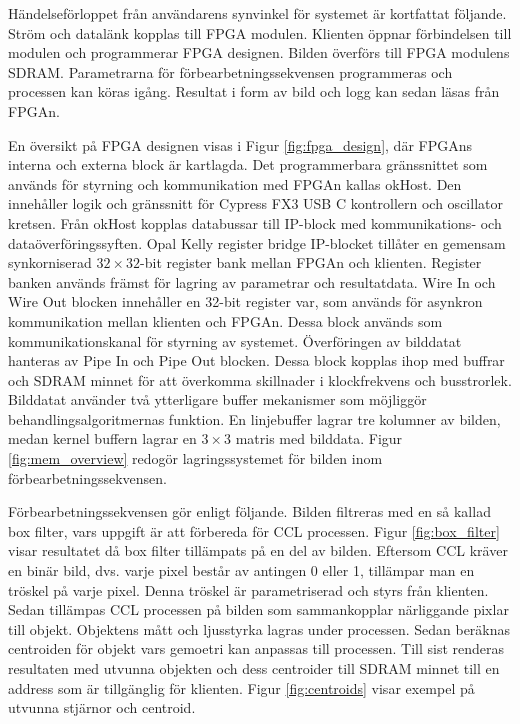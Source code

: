 \documentclass[12pt]{report}
\begin{document}
\par
Händelseförloppet från användarens synvinkel för systemet är kortfattat följande. Ström och datalänk kopplas till FPGA modulen. Klienten öppnar förbindelsen till modulen och programmerar FPGA designen. Bilden överförs till FPGA modulens SDRAM. Parametrarna för förbearbetningssekvensen programmeras och processen kan köras igång. Resultat i form av bild och logg kan sedan läsas från FPGAn.
\par
En översikt på FPGA designen visas i Figur \ref{fig:fpga_design}, där FPGAns interna och externa block är kartlagda. Det programmerbara gränssnittet som används för styrning och kommunikation med FPGAn kallas okHost. Den innehåller logik och gränssnitt för Cypress FX3 USB C kontrollern och oscillator kretsen. Från okHost kopplas databussar till IP-block med kommunikations- och dataöverföringssyften. Opal Kelly register bridge IP-blocket tillåter en gemensam synkorniserad $32 \times 32$-bit register bank mellan FPGAn och klienten. Register banken används främst för lagring av parametrar och resultatdata. Wire In och Wire Out blocken innehåller en 32-bit register var, som används för asynkron kommunikation mellan klienten och FPGAn. Dessa block används som kommunikationskanal för styrning av systemet. Överföringen av bilddatat hanteras av Pipe In och Pipe Out blocken. Dessa block kopplas ihop med buffrar och SDRAM minnet för att överkomma skillnader i klockfrekvens och busstrorlek. Bilddatat använder två ytterligare buffer mekanismer som möjliggör behandlingsalgoritmernas funktion. En linjebuffer lagrar tre kolumner av bilden, medan kernel buffern lagrar en $3 \times 3$ matris med bilddata. Figur \ref{fig:mem_overview} redogör lagringssystemet för bilden inom förbearbetningssekvensen.
\par
Förbearbetningssekvensen gör enligt följande. Bilden filtreras med en så kallad box filter, vars uppgift är att förbereda för CCL processen. Figur \ref{fig:box_filter} visar resultatet då box filter tillämpats på en del av bilden. Eftersom CCL kräver en binär bild, dvs. varje pixel består av antingen 0 eller 1, tillämpar man en tröskel på varje pixel. Denna tröskel är parametriserad och styrs från klienten. Sedan tillämpas CCL processen på bilden som sammankopplar närliggande pixlar till objekt. Objektens mått och ljusstyrka lagras under processen. Sedan beräknas centroiden för objekt vars gemoetri kan anpassas till processen. Till sist renderas resultaten med utvunna objekten och dess centroider till SDRAM minnet till en address som är tillgänglig för klienten. Figur \ref{fig:centroids} visar exempel på utvunna stjärnor och centroid.
\end{document}
